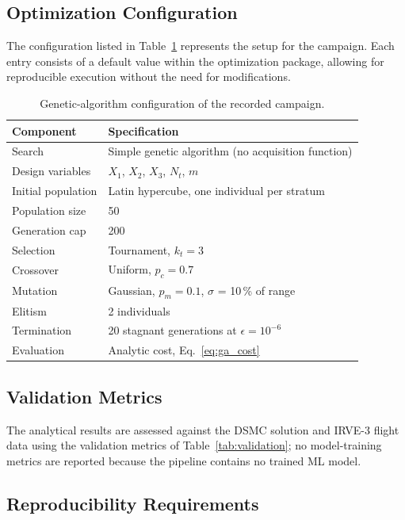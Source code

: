 \subsection{Optimization Configuration}
The configuration listed in Table~\ref{tab:ga_hparams} represents the setup for the campaign. Each entry consists of a default value within the optimization package, allowing for reproducible execution without the need for modifications.

\begin{table}[H]
    \centering
    \caption{Genetic-algorithm configuration of the recorded campaign.}
    \label{tab:ga_hparams}
    \begin{tabular}{|l|l|}
        \hline
        \textbf{Component} & \textbf{Specification} \\ \hline
        Search & Simple genetic algorithm (no acquisition function) \\ \hline
        Design variables & $X_1$, $X_2$, $X_3$, $N_t$, $m$ \\ \hline
        Initial population & Latin hypercube, one individual per stratum \\ \hline
        Population size & 50 \\ \hline
        Generation cap & 200 \\ \hline
        Selection & Tournament, $k_t = 3$ \\ \hline
        Crossover & Uniform, $p_c = 0.7$ \\ \hline
        Mutation & Gaussian, $p_m = 0.1$, $\sigma$ = 10\,\% of range \\ \hline
        Elitism & 2 individuals \\ \hline
        Termination & 20 stagnant generations at $\epsilon = 10^{-6}$ \\ \hline
        Evaluation & Analytic cost, Eq.~\eqref{eq:ga_cost} \\ \hline
    \end{tabular}
\end{table}

\subsection{Validation Metrics}
The analytical results are assessed against the DSMC solution and IRVE-3 flight data using the validation metrics of Table~\ref{tab:validation}; no model-training metrics are reported because the pipeline contains no trained ML model.

\subsection{Reproducibility Requirements}

